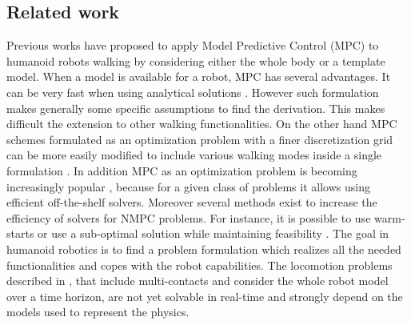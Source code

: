 \subsection{Related work}
Previous works have proposed to apply Model Predictive Control (MPC) to humanoid robots walking by considering either the whole body or a template model.
When a model is available for a robot, MPC has several advantages.
It can be very fast when using analytical solutions \cite{Morisawa:ICRA:2007,Tedrake:ur:15,Faraji:ICRA:2014}.
However such formulation makes generally some specific assumptions to find the derivation.
This makes difficult the extension to other walking functionalities.
On the other hand 
MPC schemes formulated as an optimization problem  with a finer discretization grid can be more easily modified to include various walking modes 
inside a single formulation \cite{Sherikov:ichr:2014}.
In addition MPC as an optimization problem is becoming increasingly popular \cite{Feng:ichr:2013}, 
because for a given class of problems it allows using efficient off-the-shelf solvers.
Moreover several methods exist to increase the efficiency of solvers for NMPC problems.
For instance, it is possible to use warm-starts or use a sub-optimal solution while maintaining feasibility \cite{Boyd:CO:2004}.
The goal in humanoid robotics is to find a problem formulation which realizes all the needed functionalities and copes with the robot capabilities.
The locomotion problems described in \cite{mordatch:tog:12}, that include multi-contacts and consider the whole robot model over a time horizon, 
are not yet solvable in real-time and strongly depend on the models used to represent the physics.

